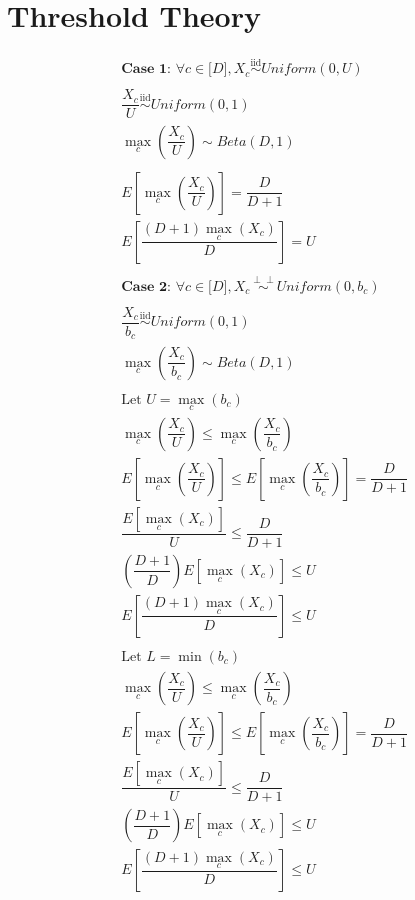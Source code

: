 \documentclass{article} %
\newcommand{\indep}{\perp \!\!\! \perp}
\begin{document}
%
\section{Threshold Theory}

\begin{align*}
    & \textbf{Case 1: } \forall c \in \mathopen[ D \mathclose], X_c \overset{\mathrm{iid}}{\sim} Uniform(0, U) \\
    \\
    & \dfrac{X_c}{U} \overset{\mathrm{iid}}{\sim} Uniform(0, 1) \\
    & \max_c \left( \dfrac{X_c}{U} \right) \sim Beta(D, 1) \\
    \\
    & E \left[ \max_c \left( \dfrac{X_c}{U} \right) \right] = \dfrac{D}{D + 1} \\
    & E \left[ \dfrac{(D + 1) \max_c \left( X_c \right)}{D} \right] = U\\
    \\
    & \textbf{Case 2: } \forall c \in \mathopen[ D \mathclose], X_c \overset{\indep}{\sim} Uniform(0, b_c) \\
    \\
    & \dfrac{X_c}{b_c} \overset{\mathrm{iid}}{\sim} Uniform(0, 1) \\
    & \max_c \left( \dfrac{X_c}{b_c} \right) \sim Beta(D, 1) \\
    \\
    & \textrm{Let } U = \max_c(b_c) \\
    & \max_c \left( \dfrac{X_c}{U} \right) \leq \max_c \left( \dfrac{X_c}{b_c} \right) \\
    & E \left[ \max_c \left( \dfrac{X_c}{U} \right) \right] \leq E \left[ \max_c \left( \dfrac{X_c}{b_c} \right) \right] = \dfrac{D}{D + 1} \\
    & \dfrac{E \left[ \max_c \left( X_c \right) \right]}{U} \leq \dfrac{D}{D + 1} \\
    & \left( \dfrac{D + 1}{D} \right) E \left[ \max_c \left( X_c \right) \right] \leq U \\
    & E \left[ \dfrac{(D + 1) \max_c \left( X_c \right)}{D} \right] \leq U \\
    \\
    & \textrm{Let } L = \min(b_c) \\
    & \max_c \left( \dfrac{X_c}{U} \right) \leq \max_c \left( \dfrac{X_c}{b_c} \right) \\
    & E \left[ \max_c \left( \dfrac{X_c}{U} \right) \right] \leq E \left[ \max_c \left( \dfrac{X_c}{b_c} \right) \right] = \dfrac{D}{D + 1} \\
    & \dfrac{E \left[ \max_c \left( X_c \right) \right]}{U} \leq \dfrac{D}{D + 1} \\
    & \left( \dfrac{D + 1}{D} \right) E \left[ \max_c \left( X_c \right) \right] \leq U \\
    & E \left[ \dfrac{(D + 1) \max_c \left( X_c \right)}{D} \right] \leq U \\
\end{align*}
\end{document}

